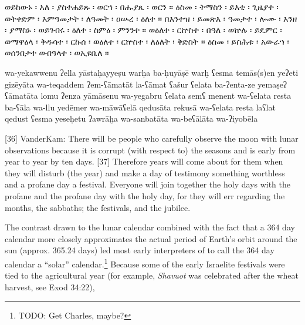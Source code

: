 \begin{ethiopictext}
    ወይከውኑ ፡ እለ ፡ ያስተሐይጹ ፡ ወርኀ ፡ በሑያጼ ፡ ወርን ።
    ዕስመ ፡ ትማስን ፡ ይእቲ ፡ ጊዜያተ ፡ ወትቀድም ፡ እምዓመታት ፡ ለዓመት ፡ ዐሡረ ፡ ዕለተ ።
    በእንተዝ ፡ ይመጽእ ፡ ዓመታተ ፡ ሎሙ ፡ እንዘ ፡ ያማስኑ ፡ ወይገብሩ ፡ ዕለተ ፡ ስምዕ ፡ ምንንተ ።
    ወዕለተ ፡ ርኵስተ ፡ በዓለ ፡ ወኵሉ ፡ ይዴምር ፡ ወማዋዕላ ፡ 
        ቅዱሳተ ፡ ርኩሰ ፡ ወዕለተ ፡ ርኵስተ ፡ ለዕለት ፡ ቅድስት ።
    ዕስመ ፡ ይስሕቱ ፡ አውራኀ ፡ ወሰንበታተ ወብዓላተ ፡ ወኢዩቤለ ።
\end{ethiopictext}
\begin{transliteration}
    wa-yekawwenu ʔella yāstaḥayyeṣu warḥa ba-ḥuyāṣē warḫ
    ʕesma temās(s)en yeʔeti gizēyāta wa-teqaddem ʔem-ʕāmatāt la-ʕāmat ʕašur ʕelata
    ba-ʔenta-ze yemaṣeʔ ʕāmatāta lomu ʔenza yāmāsenu wa-yegabru ʕelata semʕ menent
    wa-ʕelata resta ba-ʕāla wa-llu yedēmer wa-māwāʕelā 
        qedusāta rekusā wa-ʕelata resta laʕlat qedust
    ʕesma yeseḥetu ʔawrāḫa wa-sanbatāta wa-beʕālāta wa-ʔiyobēla
\end{transliteration}
\begin{translation}
    [36] VanderKam: There will be people who carefully observe the moon with lunar observations 
    because it is corrupt (with respect to) the seasons and is early from year to year by ten days. 
    [37] Therefore years will come about for them when they will disturb (the year) 
    and make a day of testimony something worthless and a profane day a festival. 
    Everyone will join together the holy days with the profane and the profane day with the holy day, 
    for they will err regarding the months, the sabbaths; the festivals, and the jubilee.
\end{translation}
\noindent
The contrast drawn to the lunar calendar combined with the fact that a 364 day calendar more closely approximates the actual period of Earth's orbit around the sun (approx. 365.24 days) led most early interpreters of \jub to call the 364 day calendar a ``solar'' calendar.\footnote{TODO: Get Charles, maybe?} Because some of the early Israelite festivals were tied to the agricultural year (for example, \emph{Shavuot} was celebrated after the wheat harvest, see Exod 34:22),
